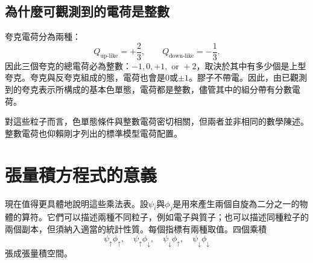 \subsection{為什麼可觀測到的電荷是整數}

夸克電荷分為兩種：
\begin{equation}
Q_{\mathrm{up\text{-}like}}=+\frac23,
\qquad
Q_{\mathrm{down\text{-}like}}=-\frac13.
\end{equation}
因此三個夸克的總電荷必為整數：\(-1,0,+1,\text{ or }+2\)，取決於其中有多少個是上型夸克。夸克與反夸克組成的態，電荷也會是\(0\)或\(\pm1\)。膠子不帶電。因此，由已觀測到的夸克表示所構成的基本色單態，電荷都是整數，儘管其中的組分帶有分數電荷。

\begin{classroomqa}
\end{classroomqa}

對這些粒子而言，色單態條件與整數電荷密切相關，但兩者並非相同的數學陳述。整數電荷也仰賴剛才列出的標準模型電荷配置。

\begin{classroomqa}
\end{classroomqa}

\section{張量積方程式的意義}

現在值得更具體地說明這些乘法表。設\(\psi_i\)與\(\phi_j\)是用來產生兩個自旋為二分之一的物體的算符。它們可以描述兩種不同粒子，例如電子與質子；也可以描述同種粒子的兩個副本，但須納入適當的統計性質。每個指標有兩種取值。四個乘積
\begin{equation}
\psi_\uparrow\phi_\uparrow,
\quad
\psi_\uparrow\phi_\downarrow,
\quad
\psi_\downarrow\phi_\uparrow,
\quad
\psi_\downarrow\phi_\downarrow
\end{equation}
張成張量積空間。

